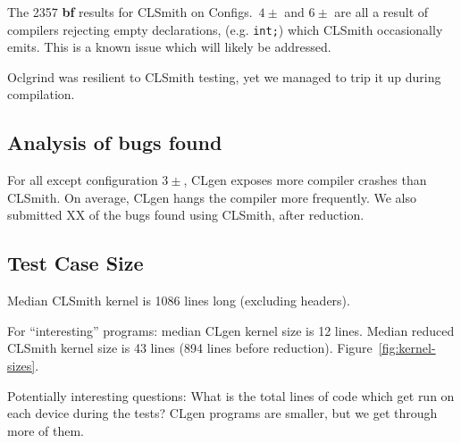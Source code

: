 

The 2357 \textbf{bf} results for CLSmith on Configs.\ $4\pm$ and $6\pm$ are all a result of compilers rejecting empty declarations, (e.g. \texttt{int;}) which CLSmith occasionally emits. This is a known issue which will likely be addressed.


Oclgrind was resilient to CLSmith testing, yet we managed to trip it up during compilation.

\subsection{Analysis of bugs found}

For all except configuration $3\pm$, CLgen exposes more compiler crashes than CLSmith. On average, CLgen hangs the compiler more frequently. We also submitted XX of the bugs found using CLSmith, after reduction.


\subsection{Test Case Size}

Median CLSmith kernel is 1086 lines long (excluding headers).

For ``interesting'' programs: median CLgen kernel size is 12 lines. Median reduced CLSmith kernel size is 43 lines (894 lines before reduction). Figure~\ref{fig:kernel-sizes}.

Potentially interesting questions: What is the total lines of code which get run on each device during the tests? CLgen programs are smaller, but we get through more of them.



